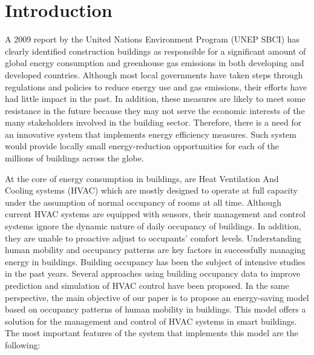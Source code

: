 \section{Introduction}
\label{sec:intro}

A 2009 report by the United Nations Environment Program (UNEP SBCI)
\cite{huovila2009buildings} has clearly identified  construction
buildings as responsible for a significant amount of global energy
consumption and greenhouse gas emissions in both developing and developed
countries. Although most local governments have taken steps through
regulations and policies to reduce energy use and gas emissions, their
efforts have had little impact in the past. In addition,  these
measures are likely to meet some resistance in the future because they
may not serve the economic interests of the many stakeholders involved
in the building sector. Therefore,  there is a need for an innovative
system that implements energy efficiency measures. Such system would
provide locally small energy-reduction opportunities for each of the
millions of buildings across the globe.

At the core of energy consumption in buildings, are Heat Ventilation
And Cooling systems (HVAC) which are mostly designed to operate at
full capacity under the assumption of normal occupancy of rooms at all
time. Although current HVAC systems are equipped with sensors, their
management and control systems ignore the dynamic nature of daily
occupancy of buildings. In addition, they are unable to proactive
adjust to occupants' comfort levels. Understanding human mobility
and occupancy patterns are key factors in successfully managing energy
in buildings. Building occupancy has been the subject of intensive
studies in the past years. Several approaches using building occupancy
data to improve prediction and simulation of HVAC control have been
proposed. In the same perspective, the main objective of our paper is
to propose an energy-saving model based on occupancy patterns of human
mobility in buildings. This model offers a solution for the management
and control of HVAC systems in smart buildings. The most important
features of the system that implements this model are the following:

